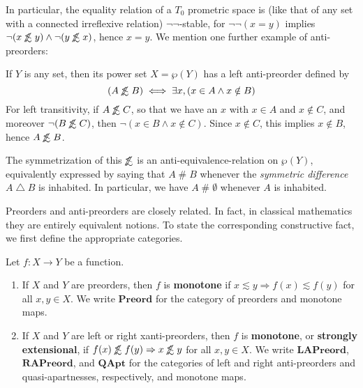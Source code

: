 \documentclass{article}
\def\apart{\mathrel{\#}}
\def\oapt{\mathrel{\!\not\,\not\lesssim}}
\def\leapx{\lesssim}
\let\implies\Rightarrow
\def\nn{\ensuremath{\neg\neg}}
\def\Preord{\mathbf{Preord}}
\def\LAPreord{\mathbf{LAPreord}}
\def\RAPreord{\mathbf{RAPreord}}
\def\QApt{\mathbf{QApt}}
\begin{document}
In particular, the equality relation of a $T_0$ prometric space is (like that of any set with a connected irreflexive relation) \nn-stable, for $\neg\neg(x=y)$ implies $\neg(x\oapt y)\land \neg(y\oapt x)$, hence $x=y$.
We mention one further example of anti-preorders:

\begin{eg}
  If $Y$ is any set, then its power set $X = \wp(Y)$ has a left anti-preorder defined by
  \[ (A\oapt B) \iff \exists x, (x\in A \land x\notin B)\]
  For left transitivity, if $A\oapt C$, so that we have an $x$ with $x\in A$ and $x\notin C$, and moreover $\neg (B\oapt C)$, then $\neg (x\in B \land x\notin C)$.
  Since $x\notin C$, this implies $x\notin B$, hence $A\oapt B$.

  The symmetrization of this $\oapt$ is an anti-equivalence-relation on $\wp(Y)$, equivalently expressed by saying that $A\apart B$ whenever the \emph{symmetric difference} $A \mathbin{\triangle} B$ is inhabited.
  In particular, we have $A\apart \emptyset$ whenever $A$ is inhabited.
\end{eg}

Preorders and anti-preorders are closely related.
In fact, in classical mathematics they are entirely equivalent notions.
To state the corresponding constructive fact, we first define the appropriate categories.

\begin{defn}
  Let $f:X\to Y$ be a function.
  \begin{enumerate}
  \item If $X$ and $Y$ are preorders, then $f$ is \textbf{monotone} if $x\leapx y \implies f(x)\leapx f(y)$ for all $x,y\in X$.
    We write $\Preord$ for the category of preorders and monotone maps.
  \item If $X$ and $Y$ are left or right xanti-preorders, then $f$ is \textbf{monotone}, or \textbf{strongly extensional}, if $f(x)\oapt f(y) \implies x\oapt y$ for all $x,y\in X$.
    We write $\LAPreord$, $\RAPreord$, and $\QApt$ for the categories of left and right anti-preorders and quasi-apartnesses, respectively, and monotone maps.
  \end{enumerate}
\end{defn}
\end{document}
